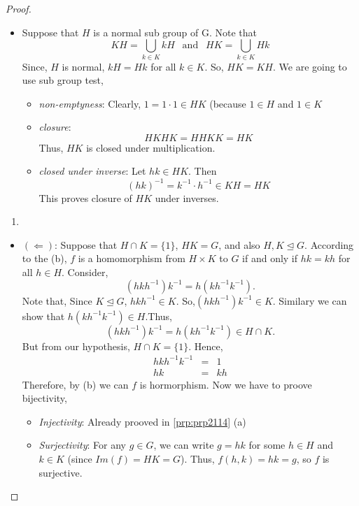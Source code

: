 \documentclass[
]{book}
\providecommand{\tightlist}{%
  \setlength{\itemsep}{0pt}\setlength{\parskip}{0pt}}
\theoremstyle{definition}
\theoremstyle{definition}
\theoremstyle{definition}
\theoremstyle{definition}
\theoremstyle{remark}
\begin{document}
\begin{proof}
\begin{itemize}
\item
  Suppose that \(H\) is a normal sub group of G. Note that \[KH=\bigcup_{k\in K}kH~~\text{   and     } ~~HK=\bigcup_{k\in K}Hk\]
  Since, \(H\) is normal, \(kH=Hk\) for all \(k\in K\). So, \(HK=KH\). We are going to use sub group test,

  \begin{itemize}
  \tightlist
  \item
    \emph{non-emptyness}: Clearly, \(1=1\cdot 1\in HK\) (because \(1\in H\) and \(1\in K\)
  \item
    \emph{closure}:
    \[HKHK=HHKK=HK\]
    Thus, \(HK\) is closed under multiplication.
  \item
    \emph{closed under inverse}: Let \(hk\in HK\). Then
    \[(hk)^{-1} = k^{-1}\cdot h^{-1} \in KH=HK \]
    This proves closure of \(HK\) under inverses.
  \end{itemize}
\end{itemize}

\begin{enumerate}
\def\labelenumi{\alph{enumi}.}
\setcounter{enumi}{3}
\tightlist
\item
\end{enumerate}

\begin{itemize}
\tightlist
\item
  \((\Longleftarrow)\): Suppose that \(H \cap K = \{1\}\), \(HK = G\), and also \(H,K \trianglelefteq G\). According to the (b), \(f\) is a homomorphism from \(H \times K\) to \(G\) if and only if \(hk = kh\) for all \(h\in H\). Consider,
  \[(hkh^{-1})k^{-1}=h(kh^{-1}k^{-1}).\]
  Note that, Since \(K \trianglelefteq G\), \(hkh^{-1}\in K\). So,\((hkh^{-1})k^{-1}\in K\). Similary we can show that \(h(kh^{-1}k^{-1})\in H\).Thus,\[(hkh^{-1})k^{-1}=h(kh^{-1}k^{-1})\in H\cap K.\] But from our hypothesis, \(H\cap K=\{1\}\). Hence,
  \begin{eqnarray}
  hkh^{-1}k^{-1}&=&1\\
  hk&=& kh
  \end{eqnarray}
  Therefore, by (b) we can \(f\) is hormorphism. Now we have to proove bijectivity,

  \begin{itemize}
  \tightlist
  \item
    \emph{Injectivity}: Already prooved in \ref{prp:prp2114} (a)
  \item
    \emph{Surjectivity}: For any \(g \in G\), we can write \(g = hk\) for some \(h \in H\) and \(k \in K\) (since \(Im(f)=HK = G\)). Thus, \(f(h, k) = hk = g\), so \(f\) is surjective.
  \end{itemize}
\end{itemize}


\end{proof}
\end{document}
